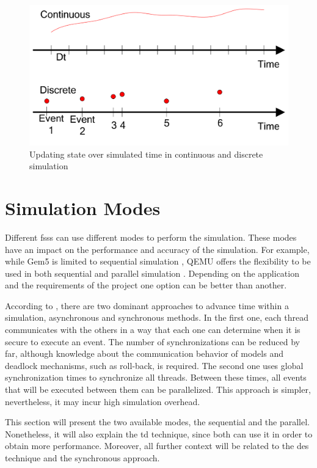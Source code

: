 \begin{figure}[H]
	\centering
 	\includegraphics[width=0.7\linewidth]{Images/DesVsCes.png}
 	\caption{Updating state over simulated time in continuous and discrete simulation \cite{helal2008hybrid}}
	 \label{fig_DesVsCes}
\end{figure}


\section{Simulation Modes}

Different \glspl{fss} can use different modes to perform the simulation. These modes have an impact on the performance and accuracy of the 
simulation. For example, while Gem5 is limited to sequential simulation \cite{TheGem5Simulator}, QEMU offers the flexibility to be used in both 
sequential and parallel simulation \cite{QEMUDoc}. Depending on the application and the requirements of the project one option can be better 
than another.

According to \cite{parallelTypes}, there are two dominant approaches to advance time within a simulation, asynchronous and synchronous methods. 
In the first one, each thread communicates with the others in a way that each one can determine when it is secure to execute an event. The number 
of synchronizations can be reduced by far, although knowledge about the communication behavior of models and deadlock mechanisms, such as 
roll-back, is required. The second one uses global synchronization times to synchronize all threads. Between these times, all events that will 
be executed between them can be parallelized. This approach is simpler, nevertheless, it may incur high simulation overhead.

This section will present the two available modes, the sequential and the parallel. Nonetheless, it will also explain 
the \gls{td} technique, since both can use it in order to obtain more performance. Moreover, all further context will be related to 
the \gls{des} technique and the synchronous approach.

